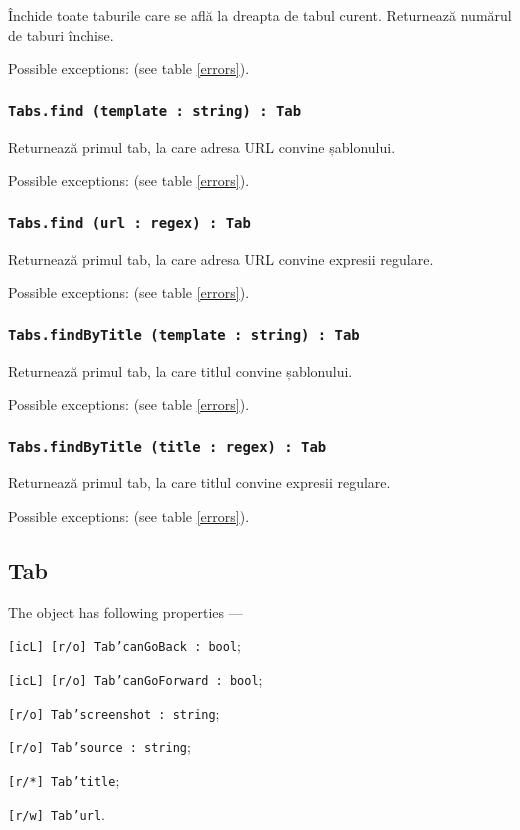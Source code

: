 Închide toate taburile care se află la dreapta de tabul curent. Returnează numărul de taburi închise.

Possible exceptions:  (see table \ref{errors}).

\subsubsection{\texttt{Tabs.find (template : string) : Tab}}

Returnează primul tab, la care adresa URL convine șablonului.

Possible exceptions:  (see table \ref{errors}).

\subsubsection{\texttt{Tabs.find (url : regex) : Tab}}

Returnează primul tab, la care adresa URL convine expresii regulare.

Possible exceptions:  (see table \ref{errors}).

\subsubsection{\texttt{Tabs.findByTitle (template : string) : Tab}}

Returnează primul tab, la care titlul convine șablonului.

Possible exceptions:  (see table \ref{errors}).

\subsubsection{\texttt{Tabs.findByTitle (title : regex) : Tab}}

Returnează primul tab, la care titlul convine expresii regulare.

Possible exceptions:  (see table \ref{errors}).

\subsection{{\color{orange} Tab}}

The object \tab{} has following properties —
\begin{icItems}
	\item \texttt{[icL] [r/o] Tab'canGoBack : bool};
	\item \texttt{[icL] [r/o] Tab'canGoForward : bool};
	\item \texttt{[r/o] Tab'screenshot : string};
	\item \texttt{[r/o] Tab'source : string};
	\item \texttt{[r/*] Tab'title};
	\item \texttt{[r/w] Tab'url}.
\end{icItems}

